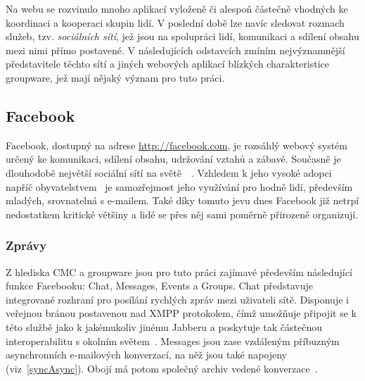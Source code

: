 \documentclass[12pt,oneside,final]{fithesis2}
\begin{document}
Na webu se rozvinulo mnoho aplikací vyloženě či alespoň částečně vhodných ke koordinaci a kooperaci skupin lidí. V poslední době lze navíc sledovat rozmach služeb, tzv. \emph{sociálních sítí}, jež jsou na spolupráci lidí, komunikaci a sdílení obsahu mezi nimi přímo postavené. V následujících odstavcích zmíním nejvýznamnější představitele těchto sítí a jiných webových aplikací blízkých charakteristice groupware, jež mají nějaký význam pro tuto práci.

\subsection{Facebook}\label{facebook}
Facebook, dostupný na adrese \url{http://facebook.com}, je rozsáhlý webový systém určený ke komunikaci, sdílení obsahu, udržování vztahů a zábavě. Současně je dlouhodobě největší sociální sítí na světě~\cite{kazeniac2009social}~\cite{protalinski2012facebook}. Vzhledem k jeho vysoké adopci napříč obyvatelstvem~\cite{docekal2011socialni} je samozřejmost jeho využívání pro hodně lidí, především mladých, srovnatelná s e-mailem. Také díky tomuto jevu dnes Facebook již netrpí nedostatkem kritické většiny a lidé se přes něj sami poměrně přirozeně organizují.

\subsubsection*{Zprávy}
Z hlediska CMC a groupware jsou pro tuto práci zajímavé především následující funkce Facebooku: Chat, Messages, Events a Groups. Chat představuje integrované rozhraní pro posílání rychlých zpráv mezi uživateli sítě. Disponuje i veřejnou bránou postavenou nad XMPP protokolem, čímž umožňuje připojit se k této službě jako k jakémukoliv jinému Jabberu a poskytuje tak částečnou interoperabilitu s okolním světem~\cite{reiss2010facebook}. Messages jsou zase vzdáleným příbuzným asynchronních e-mailových konverzací, na něž jsou také napojeny (viz~\ref{syncAsync}). Obojí má potom společný archiv vedené konverzace~\cite{seligstein2010see}.
\end{document}

